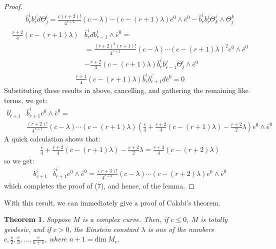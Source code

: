 \documentclass[11pt]{amsart}
\newtheorem{thm}[subsection]{Theorem}
\theoremstyle{definition}
\theoremstyle{definition}
\def \dim{ \text{dim} }
\begin{document}
\begin{proof}
%
\begin{align*}
\bar{b}^i_r b^j_r d \Theta^i_j = \frac{c(r+2)!}{4^{r+2}} (c - \lambda) \cdots (c - (r+1) \lambda) e^0 \wedge \bar{e}^0 - \bar{b}^i_r b^j_r \Theta^i_k \wedge \Theta^k_j
\end{align*}
%
\begin{align*}
\frac{r+2}{4}( c  - (r+1) \lambda ) & \bar{b}^i_r d b^i_{r-1} \wedge \bar{e}^0 = \\
&= \frac{ (r+2)^2 (r+1)!}{4^{r+2}} (c - \lambda) \cdots (c - (r+1) \lambda)^2 e^0 \wedge \bar{e}^0 \\
&- \frac{r+2}{4}(c - (r+1) \lambda) \bar{b}^i_r b^j_{r-1} \Theta^i_j \wedge \bar{e}^0
\end{align*}
%
\begin{align*}
\frac{r+1}{4} (c - (r+1) \lambda ) \bar{b}^i_r b^i_{r+1} d \bar{e}^0 = 0
\end{align*}
%
Substituting these results in above, cancelling, and gathering the remaining like terms, we get:
%
\begin{align*}
b^i_{r+1} & \bar{b}^i_{r+1}  e^0 \wedge \bar{e}^0 = \\
& \frac{(r+2)!}{4^{r+1}} (c- \lambda) \cdots (c - (r+1) \lambda) \left( \frac{c}{4} + \frac{r+2}{4}(c - (r+1) \lambda) - \frac{r + 2}{2} \lambda \right) e^0 \wedge \bar{e}^0
\end{align*}
%
A quick calculation shows that:
%
\begin{align*}
\frac{c}{4} + \frac{r+2}{4}(c - (r+1) \lambda) - \frac{r + 2}{2} \lambda = \frac{r+3}{4}( c - (r+2) \lambda )
\end{align*}
%
so we get:
%
\begin{align*}
b^i_{r+1} & \bar{b}^i_{r+1}  e^0 \wedge \bar{e}^0 = \frac{(r+3)!}{4^{r+2}}(c - \lambda) \cdots (c - (r+2) \lambda) e^0 \wedge \bar{e}^0
\end{align*}
%
which completes the proof of (7), and hence, of the lemma.
%
\end{proof}

With this result, we can immediately give a proof of Calabi's theorem.

\begin{thm} Suppose $M$ is a complex curve.  Then, if $c \leq 0$, $M$ is totally geodesic, and if $c > 0$, the Einstein constant $\lambda$ is one of the numbers $c, \frac{c}{2}, \frac{c}{3}, \ldots, \frac{c}{n + 1}$, where $n + 1 = \dim \ M_c$.
\end{thm}
\end{document}
